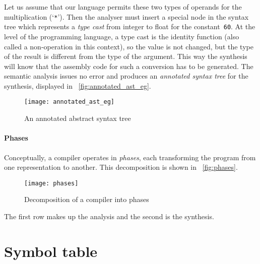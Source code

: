 Let us assume that our language permits these two types of operands
for the multiplication (`\texttt{*}'). Then the analyser must insert a
special node in the syntax tree which represents a \emph{type cast}
from integer to float for the constant~\texttt{60}. At the level of
the programming language, a type cast is the identity function (also
called a non\hyp{}operation in this context), so the value is not
changed, but the type of the result is different from the type of the
argument. This way the synthesis will know that the assembly code for
such a conversion has to be generated. The semantic analysis issues no
error and produces an
\emph{annotated syntax tree} for the synthesis, displayed in
\fig~\vref{fig:annotated_ast_eg}.
\begin{figure}
\centering
\texttt{[image: annotated\_ast\_eg]}
\caption{An annotated abstract syntax tree\label{fig:annotated_ast_eg}}
\end{figure}

\paragraph{Phases}

Conceptually, a compiler operates in \emph{phases}, each transforming
the program from one representation to another. This decomposition is
shown in \fig~\vref{fig:phases}.
\begin{figure}
\centering
\texttt{[image: phases]}
\caption{Decomposition of a compiler into phases\label{fig:phases}}
\end{figure}
The first row makes up the analysis and the second is the synthesis.

\section*{Symbol table}

